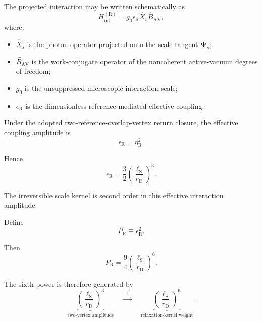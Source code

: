 The projected interaction may be written schematically as
\begin{equation}
    H_{\mathrm{int}}^{(\mathrm R)}
    =
    g_0
    \epsilon_{\mathrm R}
    \hat X_s
    \hat B_{\mathrm{AV}},
    \label{eq:AQ_Hint}
\end{equation}
where:

\begin{itemize}
    \item $\hat X_s$ is the photon operator projected onto the scale tangent
    $\boldsymbol{\Psi}_s$;

    \item $\hat B_{\mathrm{AV}}$ is the work-conjugate operator of the
    noncoherent active-vacuum degrees of freedom;

    \item $g_0$ is the unsuppressed microscopic interaction scale;

    \item $\epsilon_{\mathrm R}$ is the dimensionless
    reference-mediated effective coupling.
\end{itemize}

Under the adopted two-reference-overlap-vertex return closure, the effective
coupling amplitude is
\begin{equation}
    \epsilon_{\mathrm R}
    =
    \eta_{\mathrm R}^{2}.
\end{equation}

Hence
\begin{equation}
    \boxed{
    \epsilon_{\mathrm R}
    =
    \frac{3}{2}
    \left(
        \frac{\ell_{\mathrm S}}{r_{\mathrm D}}
    \right)^3.
    }
    \label{eq:AQ_epsilonR}
\end{equation}

The irreversible scale kernel is second order in this effective interaction
amplitude.

Define
\begin{equation}
    P_{\mathrm R}
    \equiv
    \epsilon_{\mathrm R}^{2}.
    \label{eq:AQ_PRdef}
\end{equation}

Then
\begin{equation}
    \boxed{
    P_{\mathrm R}
    =
    \frac{9}{4}
    \left(
        \frac{\ell_{\mathrm S}}{r_{\mathrm D}}
    \right)^6.
    }
    \label{eq:AQ_PR}
\end{equation}

The sixth power is therefore generated by
\begin{equation}
    \boxed{
    \underbrace{
    \left(
        \frac{\ell_{\mathrm S}}{r_{\mathrm D}}
    \right)^3
    }_{\text{two-vertex amplitude}}
    \quad
    \xrightarrow{\;|\cdot|^2\;}
    \quad
    \underbrace{
    \left(
        \frac{\ell_{\mathrm S}}{r_{\mathrm D}}
    \right)^6
    }_{\text{relaxation-kernel weight}}.
    }
    \label{eq:AQ_sixth_power_origin}
\end{equation}

